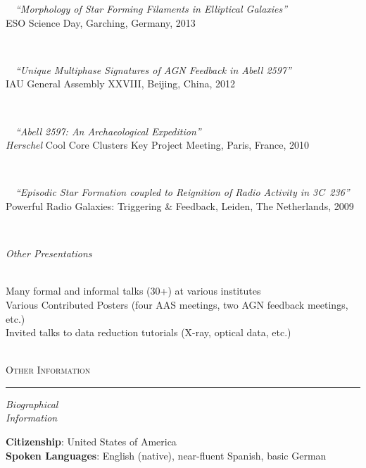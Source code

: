 \documentclass[11pt]{article}
\makeatletter
\def\vhrulefill#1{\leavevmode\leaders\hrule\@height#1\hfill \kern\z@}
\makeatother
\begin{document}
\hspace{42mm} \parbox{5.15in}{
\textbullet~~\textit{``Morphology of Star Forming Filaments in Elliptical Galaxies''} \\ ESO Science Day, Garching, Germany, 2013}\\

\hspace{42mm} \parbox{5.15in}{
\textbullet~~\textit{``Unique Multiphase Signatures of AGN Feedback in Abell 2597''} \\ IAU General Assembly XXVIII, Beijing, China, 2012 } \\

\hspace{42mm} \parbox{5.15in}{
\textbullet~~\textit{``Abell 2597: An Archaeological Expedition''} \\ \textit{Herschel} Cool Core Clusters Key Project Meeting, Paris, France, 2010 } \\

\hspace{42mm} \parbox{5.15in}{
\textbullet~~\textit{``Episodic Star Formation coupled to Reignition of Radio Activity in 3C~236''} \\
Powerful Radio Galaxies: Triggering \& Feedback, Leiden, The Netherlands, 2009 } \\


\vspace{4mm}

\hspace{2.5mm} \parbox{1.5in}{\textit{Other Presentations \\\\}} \parbox{5.15in}{
Many formal and informal talks (30+) at various institutes\\
Various Contributed Posters (four AAS meetings, two AGN feedback meetings, etc.)\\
Invited talks to data reduction tutorials (X-ray, optical data, etc.)
}\\

\clearpage
\textsc{Other Information} \vhrulefill{0.4pt}

\vspace{4mm}


\hspace{2.5mm} \parbox{1.5in}{\textit{Biographical \\ Information  }} \parbox{5.15in}{
\textbf{Citizenship}: United States of America\\
\textbf{Spoken Languages}: English (native), near-fluent Spanish, basic German}\\
\end{document}
